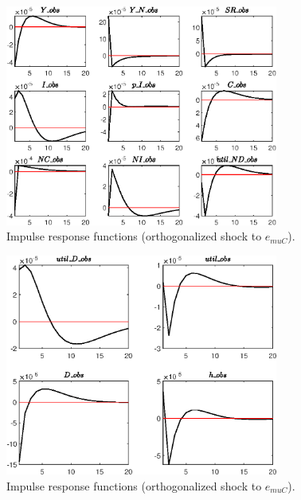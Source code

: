 \begin{figure}[H]
\centering 
\includegraphics[width=0.80\textwidth]{BRS_sectoral/graphs/BRS_sectoral_IRF_e_muC1}
\caption{Impulse response functions (orthogonalized shock to ${e_{muC}}$).}\label{Fig:IRF:e_muC:1}
\end{figure}
 
\begin{figure}[H]
\centering 
\includegraphics[width=0.80\textwidth]{BRS_sectoral/graphs/BRS_sectoral_IRF_e_muC2}
\caption{Impulse response functions (orthogonalized shock to ${e_{muC}}$).}\label{Fig:IRF:e_muC:2}
\end{figure}
 
